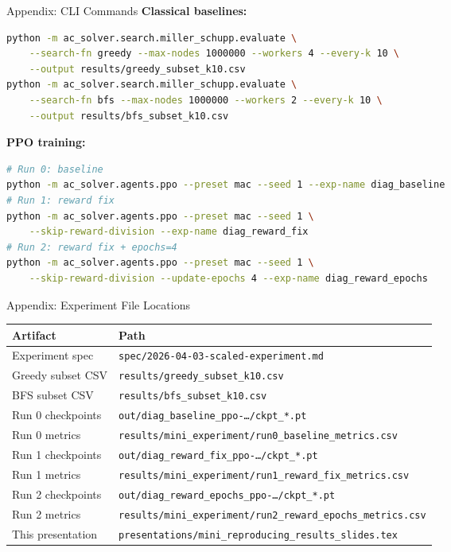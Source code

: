 \documentclass[aspectratio=169,11pt]{beamer}
\begin{document}
\begin{frame}{Appendix: CLI Commands}
  \footnotesize
  \textbf{Classical baselines:}
  \begin{lstlisting}[language=bash]
python -m ac_solver.search.miller_schupp.evaluate \
    --search-fn greedy --max-nodes 1000000 --workers 4 --every-k 10 \
    --output results/greedy_subset_k10.csv
python -m ac_solver.search.miller_schupp.evaluate \
    --search-fn bfs --max-nodes 1000000 --workers 2 --every-k 10 \
    --output results/bfs_subset_k10.csv
  \end{lstlisting}

  \textbf{PPO training:}
  \begin{lstlisting}[language=bash]
# Run 0: baseline
python -m ac_solver.agents.ppo --preset mac --seed 1 --exp-name diag_baseline
# Run 1: reward fix
python -m ac_solver.agents.ppo --preset mac --seed 1 \
    --skip-reward-division --exp-name diag_reward_fix
# Run 2: reward fix + epochs=4
python -m ac_solver.agents.ppo --preset mac --seed 1 \
    --skip-reward-division --update-epochs 4 --exp-name diag_reward_epochs
  \end{lstlisting}
\end{frame}

\begin{frame}{Appendix: Experiment File Locations}
  \small
  \begin{tabular}{ll}
    \toprule
    \textbf{Artifact} & \textbf{Path} \\
    \midrule
    Experiment spec & \texttt{spec/2026-04-03-scaled-experiment.md} \\
    \midrule
    Greedy subset CSV  & \texttt{results/greedy\_subset\_k10.csv} \\
    BFS subset CSV     & \texttt{results/bfs\_subset\_k10.csv} \\
    \midrule
    Run 0 checkpoints  & \texttt{out/diag\_baseline\_ppo-\ldots/ckpt\_*.pt} \\
    Run 0 metrics      & \texttt{results/mini\_experiment/run0\_baseline\_metrics.csv} \\
    Run 1 checkpoints  & \texttt{out/diag\_reward\_fix\_ppo-\ldots/ckpt\_*.pt} \\
    Run 1 metrics      & \texttt{results/mini\_experiment/run1\_reward\_fix\_metrics.csv} \\
    Run 2 checkpoints  & \texttt{out/diag\_reward\_epochs\_ppo-\ldots/ckpt\_*.pt} \\
    Run 2 metrics      & \texttt{results/mini\_experiment/run2\_reward\_epochs\_metrics.csv} \\
    \midrule
    This presentation  & \texttt{presentations/mini\_reproducing\_results\_slides.tex} \\
    \bottomrule
  \end{tabular}
\end{frame}
\end{document}

